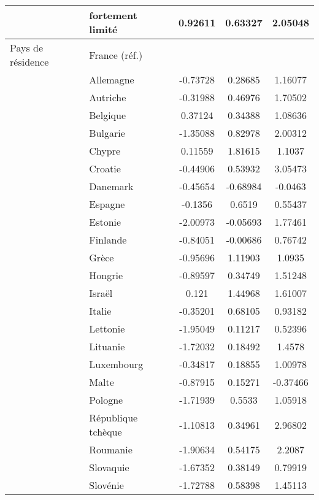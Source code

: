 \begin{Article}
\begin{refsection}[Bonnal]
\begin{table}
{\begin{threeparttable}
\begin{tabular}{l@{\quad}l@{} S!{\quad}S!{\quad}S!{\quad}}
		& fortement limité & 0.92611\sym{***} & 0.63327\sym{***} & 2.05048\sym{***} \\\hline
		Pays de résidence & France (réf.) & & & \\
		& Allemagne & -0.73728\sym{***} & 0.28685\sym{*} & 1.16077\sym{**} \\
		& Autriche & -0.31988\sym{**} & 0.46976\sym{***} & 1.70502\sym{***} \\
		& Belgique & 0.37124\sym{***} & 0.34388\sym{***} & 1.08636\sym{***} \\
		& Bulgarie & -1.35088\sym{***} & 0.82978\sym{**} & 2.00312\sym{***} \\
		& Chypre & 0.11559 & 1.81615\sym{***} & 1.1037 \\
		& Croatie & -0.44906\sym{*} & 0.53932\sym{*} & 3.05473\sym{***} \\
		& Danemark & -0.45654\sym{***} & -0.68984\sym{***} & -0.0463 \\
		& Espagne & -0.1356 & 0.6519\sym{***} & 0.55437 \\
		& Estonie & -2.00973\sym{***} & -0.05693 & 1.77461\sym{***} \\
		& Finlande & -0.84051\sym{***} & -0.00686 & 0.76742 \\
		& Grèce & -0.95696\sym{***} & 1.11903\sym{***} & 1.0935\sym{**} \\
		& Hongrie & -0.89597\sym{***} & 0.34749 & 1.51248\sym{***} \\
		& Israël & 0.121 & 1.44968\sym{***} & 1.61007\sym{**} \\
		& Italie & -0.35201\sym{**} & 0.68105\sym{***} & 0.93182\sym{*} \\
		& Lettonie & -1.95049\sym{***} & 0.11217 & 0.52396 \\
		& Lituanie & -1.72032\sym{***} & 0.18492 & 1.4578\sym{***} \\
		& Luxembourg & -0.34817 & 0.18855 & 1.00978 \\
		& Malte & -0.87915\sym{***} & 0.15271 & -0.37466 \\
		& Pologne & -1.71939\sym{***} & 0.5533\sym{*} & 1.05918\sym{**} \\
		& République tchèque & -1.10813\sym{***} & 0.34961\sym{*} & 2.96802\sym{***} \\
		& Roumanie & -1.90634\sym{***} & 0.54175 & 2.2087\sym{***} \\
		& Slovaquie & -1.67352\sym{***} & 0.38149 & 0.79919 \\
		& Slovénie & -1.72788\sym{***} & 0.58398\sym{**} & 1.45113\sym{***} \\

\end{tabular}
\end{threeparttable}}
\end{table}
\end{refsection}
\end{Article}
